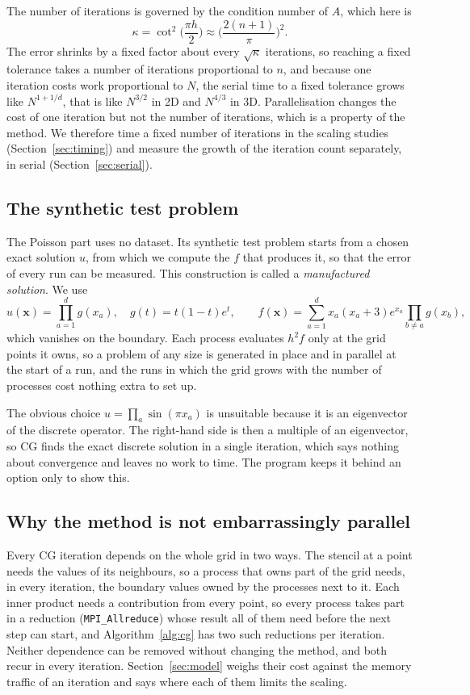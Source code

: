 \documentclass[10pt,a4paper]{article}
\newcommand{\code}[1]{\texttt{#1}}
\newcommand{\term}[1]{\emph{#1}}%
\begin{document}
The number of iterations is governed by the condition number of $A$, which here is
\begin{equation*}
\kappa=\cot^2\Big(\frac{\pi h}{2}\Big)\approx\Big(\frac{2(n+1)}{\pi}\Big)^2.
\end{equation*}
The error shrinks by a fixed factor about every $\sqrt{\kappa}$ iterations, so reaching a fixed
tolerance takes a number of iterations proportional to $n$, and because one iteration costs work proportional to $N$,
the serial time to a fixed tolerance grows like $N^{1+1/d}$, that is like $N^{3/2}$ in 2D and $N^{4/3}$ in 3D.
Parallelisation changes the cost of one iteration but not the number of iterations, which is a property of the method.
We therefore time a fixed number of iterations in the scaling studies (Section~\ref{sec:timing}) and measure the growth
of the iteration count separately, in serial (Section~\ref{sec:serial}).

\subsection{The synthetic test problem}\label{sec:problem}
The Poisson part uses no dataset. Its synthetic test problem starts from a chosen exact solution $u$, from which we
compute the $f$ that produces it, so that the error of every run can be measured. This construction is called a
\term{manufactured solution}. We use
\begin{equation*}
u(\mathbf{x})=\prod_{a=1}^{d} g(x_a),\quad g(t)=t(1-t)e^{t},\qquad
f(\mathbf{x})=\sum_{a=1}^{d} x_a(x_a+3)e^{x_a}\prod_{b\ne a} g(x_b),
\end{equation*}
which vanishes on the boundary. Each process evaluates $h^2 f$ only at the grid points it owns, so a problem of any size
is generated in place and in parallel at the start of a run, and the runs in which the grid grows with the number of
processes cost nothing extra to set up.

The obvious choice $u=\prod_a\sin(\pi x_a)$ is unsuitable because it is an eigenvector of the discrete operator. The
right-hand side is then a multiple of an eigenvector, so CG finds the exact discrete solution in a single iteration,
which says nothing about convergence and leaves no work to time. The program keeps it behind an option only to show
this.

\subsection{Why the method is not embarrassingly parallel}
Every CG iteration depends on the whole grid in two ways. The stencil at a point needs the values of its neighbours, so
a process that owns part of the grid needs, in every iteration, the boundary values owned by the processes next to it.
Each inner product needs a contribution from every point, so every process takes part in a reduction
(\code{MPI\_Allreduce}) whose result all of them need before the next step can start, and Algorithm~\ref{alg:cg} has
two such reductions per iteration. Neither dependence can be removed without changing the method, and both recur in
every iteration. Section~\ref{sec:model} weighs their cost against the memory traffic of an iteration and says where
each of them limits the scaling.
\end{document}
